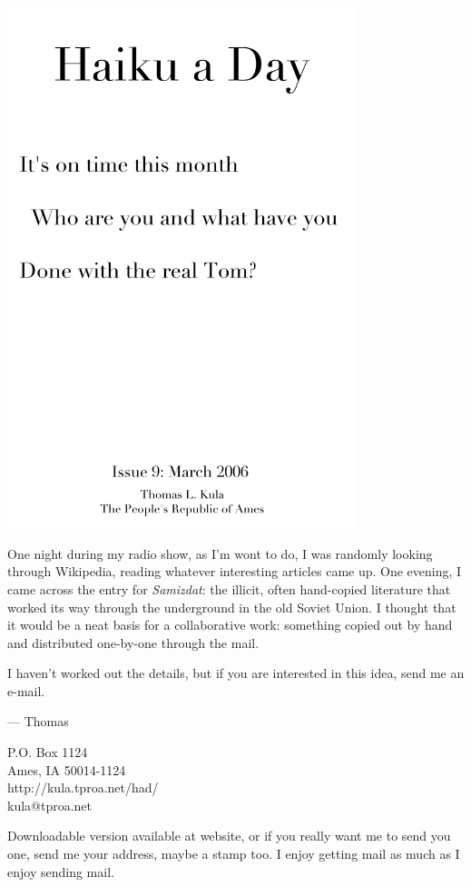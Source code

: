 \documentclass[12pt]{article}
\begin{document}
\includegraphics[width=101mm]{frontpage.png}

\newpage

One night during my radio show, as I'm wont to do, I was
randomly looking through Wikipedia, reading whatever interesting
articles came up. One evening, I came across the entry for 
{\em Samizdat}: the illicit, often hand-copied literature that
worked its way through the underground in the old Soviet Union.
I thought that it would be a neat basis for a collaborative
work: something copied out by hand and distributed one-by-one
through the mail.

I haven't worked out the details, but if you are interested
in this idea, send me an e-mail.

--- Thomas

P.O. Box 1124 \\
Ames, IA 50014-1124 \\
http://kula.tproa.net/had/ \\
kula@tproa.net

Downloadable version available at website, or if you really
want me to send you one, send me your address, maybe a
stamp too. I enjoy getting mail as much as I enjoy sending
mail.\\
\end{document}
